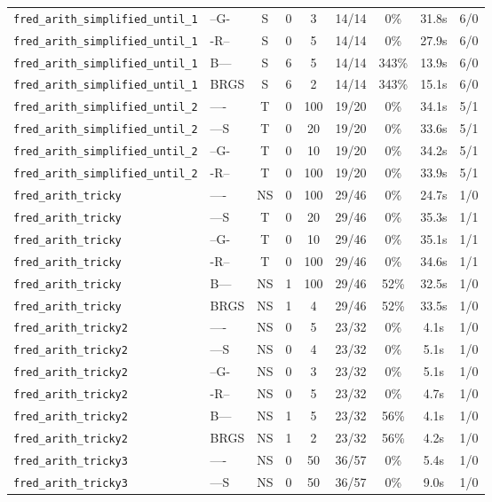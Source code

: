 \begin{tabular}{llccccccc}
\texttt{fred_arith_simplified_until_1} & --G- & S & 0 & 3 & 14/14 & 0\% & 31.8s & 6/0 \\
\texttt{fred_arith_simplified_until_1} & -R-- & S & 0 & 5 & 14/14 & 0\% & 27.9s & 6/0 \\
\texttt{fred_arith_simplified_until_1} & B--- & S & 6 & 5 & 14/14 & 343\% & 13.9s & 6/0 \\
\texttt{fred_arith_simplified_until_1} & BRGS & S & 6 & 2 & 14/14 & 343\% & 15.1s & 6/0 \\
\texttt{fred_arith_simplified_until_2} & ---- & T & 0 & 100 & 19/20 & 0\% & 34.1s & 5/1 \\
\texttt{fred_arith_simplified_until_2} & ---S & T & 0 & 20 & 19/20 & 0\% & 33.6s & 5/1 \\
\texttt{fred_arith_simplified_until_2} & --G- & T & 0 & 10 & 19/20 & 0\% & 34.2s & 5/1 \\
\texttt{fred_arith_simplified_until_2} & -R-- & T & 0 & 100 & 19/20 & 0\% & 33.9s & 5/1 \\
\texttt{fred_arith_tricky} & ---- & NS & 0 & 100 & 29/46 & 0\% & 24.7s & 1/0 \\
\texttt{fred_arith_tricky} & ---S & T & 0 & 20 & 29/46 & 0\% & 35.3s & 1/1 \\
\texttt{fred_arith_tricky} & --G- & T & 0 & 10 & 29/46 & 0\% & 35.1s & 1/1 \\
\texttt{fred_arith_tricky} & -R-- & T & 0 & 100 & 29/46 & 0\% & 34.6s & 1/1 \\
\texttt{fred_arith_tricky} & B--- & NS & 1 & 100 & 29/46 & 52\% & 32.5s & 1/0 \\
\texttt{fred_arith_tricky} & BRGS & NS & 1 & 4 & 29/46 & 52\% & 33.5s & 1/0 \\
\texttt{fred_arith_tricky2} & ---- & NS & 0 & 5 & 23/32 & 0\% & 4.1s & 1/0 \\
\texttt{fred_arith_tricky2} & ---S & NS & 0 & 4 & 23/32 & 0\% & 5.1s & 1/0 \\
\texttt{fred_arith_tricky2} & --G- & NS & 0 & 3 & 23/32 & 0\% & 5.1s & 1/0 \\
\texttt{fred_arith_tricky2} & -R-- & NS & 0 & 5 & 23/32 & 0\% & 4.7s & 1/0 \\
\texttt{fred_arith_tricky2} & B--- & NS & 1 & 5 & 23/32 & 56\% & 4.1s & 1/0 \\
\texttt{fred_arith_tricky2} & BRGS & NS & 1 & 2 & 23/32 & 56\% & 4.2s & 1/0 \\
\texttt{fred_arith_tricky3} & ---- & NS & 0 & 50 & 36/57 & 0\% & 5.4s & 1/0 \\
\texttt{fred_arith_tricky3} & ---S & NS & 0 & 50 & 36/57 & 0\% & 9.0s & 1/0 \\

\end{tabular}
